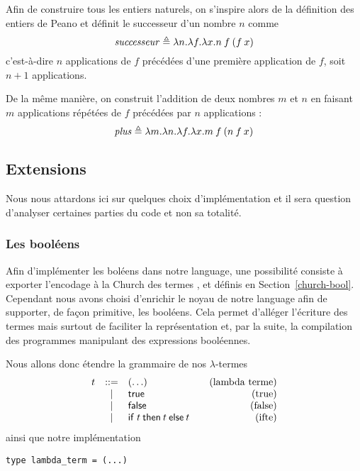 \documentclass {article}
\makeatletter
\newcommand{\codefrom}[3]
           {}
\theoremstyle{definition}
\theoremstyle{remark}
\newenvironment{bnf}
               {\[\begin{array}{lcl@{\qquad}r}}
               {\end{array}\]}
\makeatother
\begin{document}
Afin de construire tous les entiers naturels, on s'inspire alors de la
définition des entiers de Peano et définit le successeur d'un nombre \(n\)
comme
%
\[
\mathit{successeur} \triangleq \lambda n. \lambda f. \lambda x. n\:f\:(f\:x)
\]
%
c'est-à-dire \(n\) applications de \(f\) précédées d'une première
application de \(f\), soit \(n+1\) applications.

De la même manière, on construit l'addition de deux nombres \(m\) et
\(n\) en faisant \(m\) applications répétées de \(f\) précédées par
\(n\) applications :
%
\[
\mathit{plus} \triangleq \lambda m. \lambda n. \lambda f. \lambda x. m\:f\:(n\:f\:x)
\]


\subsection{Extensions}

Nous nous attardons ici sur quelques choix d'implémentation et il
sera question d'analyser certaines parties du code et non sa totalité.

\subsubsection{Les booléens}

\newcommand{\NTrue}{\lstinline!True!}
\newcommand{\NFalse}{\lstinline!False!}
\newcommand{\NIfte}{\lstinline!IfThenElse!}

Afin d'implémenter les boléens dans notre language, une possibilité
consiste à exporter l'encodage à la Church des termes \True{},
\False{} et \Ifte{} définis en Section~\ref{church-bool}. Cependant
nous avons choisi d'enrichir le noyau de notre language afin de
supporter, de façon primitive, les booléens. Cela permet d'alléger
l'écriture des termes mais surtout de faciliter la représentation et,
par la suite, la compilation des programmes manipulant des expressions
booléennes.


Nous allons donc étendre la grammaire de nos $\lambda$-termes
\begin{bnf}
  t &::= & (\ldots) &\mbox{(lambda terme)} \\
  &|& \true & \mbox{(true)} \\
  &|& \false & \mbox{(false)} \\
  &|& \ifte{t}{t}{t} & \mbox{(ifte)}
\end{bnf}
%
ainsi que notre implémentation
%
\begin{lstlisting}
type lambda_term = (...)
\end{lstlisting}
\vspace{-.7\baselineskip}
\codefrom{untyped}{lambda}{bool_term}
\end{document}
